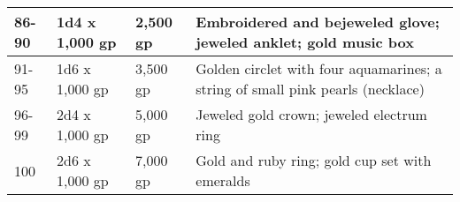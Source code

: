 \begin{longtable}{llllllll}
\multicolumn{5}{p{3.040in}|}{\begin{minipage}[t]{3.040in}\raggedright
86-90\end{minipage}} & \multicolumn{1}{|p{0.349in}|}{\begin{minipage}[t]{0.349in}\raggedright
1d4 x 1,000 gp\end{minipage}} & \multicolumn{1}{p{0.661in}|}{\begin{minipage}[t]{0.661in}\raggedright
2,500 gp\end{minipage}} & \multicolumn{1}{p{0.450in}|}{\begin{minipage}[t]{0.450in}\raggedright
Embroidered and bejeweled glove; jeweled anklet; gold music box\end{minipage}}\\
\hline
\multicolumn{5}{p{3.040in}|}{\begin{minipage}[t]{3.040in}\raggedright
91-95\end{minipage}} & \multicolumn{1}{|p{0.349in}|}{\begin{minipage}[t]{0.349in}\raggedright
1d6 x 1,000 gp\end{minipage}} & \multicolumn{1}{p{0.661in}|}{\begin{minipage}[t]{0.661in}\raggedright
3,500 gp\end{minipage}} & \multicolumn{1}{p{0.450in}|}{\begin{minipage}[t]{0.450in}\raggedright
Golden circlet with four aquamarines; a string of small pink pearls (necklace)\end{minipage}}\\
\hline
\multicolumn{5}{p{3.040in}|}{\begin{minipage}[t]{3.040in}\raggedright
96-99\end{minipage}} & \multicolumn{1}{|p{0.349in}|}{\begin{minipage}[t]{0.349in}\raggedright
2d4 x 1,000 gp\end{minipage}} & \multicolumn{1}{p{0.661in}|}{\begin{minipage}[t]{0.661in}\raggedright
5,000 gp\end{minipage}} & \multicolumn{1}{p{0.450in}|}{\begin{minipage}[t]{0.450in}\raggedright
Jeweled gold crown; jeweled electrum ring\end{minipage}}\\
\hline
\multicolumn{5}{p{3.040in}|}{\begin{minipage}[t]{3.040in}\raggedright
100\end{minipage}} & \multicolumn{1}{|p{0.349in}|}{\begin{minipage}[t]{0.349in}\raggedright
2d6 x 1,000 gp\end{minipage}} & \multicolumn{1}{p{0.661in}|}{\begin{minipage}[t]{0.661in}\raggedright
7,000 gp\end{minipage}} & \multicolumn{1}{p{0.450in}|}{\begin{minipage}[t]{0.450in}\raggedright
Gold and ruby ring; gold cup set with emeralds\end{minipage}}\\
\hline
\end{longtable}

